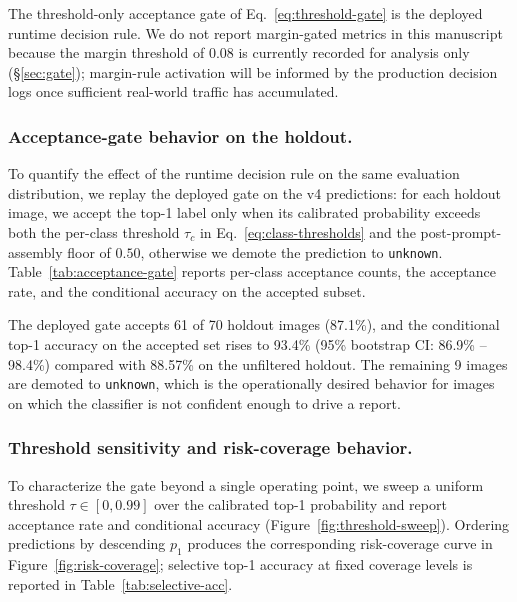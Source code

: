 The threshold-only acceptance gate of Eq.~\ref{eq:threshold-gate} is the
deployed runtime decision rule. We do not report margin-gated metrics
in this manuscript because the margin threshold of $0.08$ is currently
recorded for analysis only (\S\ref{sec:gate}); margin-rule activation
will be informed by the production decision logs once sufficient
real-world traffic has accumulated.

\subsubsection*{Acceptance-gate behavior on the holdout.}

To quantify the effect of the runtime decision rule on the same
evaluation distribution, we replay the deployed gate on the v4
predictions: for each holdout image, we accept the top-1 label only
when its calibrated probability exceeds both the per-class threshold
$\tau_c$ in Eq.~\ref{eq:class-thresholds} and the post-prompt-assembly
floor of $0.50$, otherwise we demote the prediction to
\texttt{unknown}. Table~\ref{tab:acceptance-gate} reports per-class
acceptance counts, the acceptance rate, and the conditional accuracy
on the accepted subset.

\begin{table}[t]
\centering
\caption{Acceptance-gate behavior on the balanced holdout. ``Acceptance
rate'' is the fraction of class examples whose top-1 probability
clears both $\tau_c$ and the $0.50$ floor; ``Acc. $\mid$ accepted'' is
the conditional accuracy on the accepted subset. The aggregate row
reports a nonparametric bootstrap 95\% CI on conditional accuracy.}
\label{tab:acceptance-gate}

\end{table}

The deployed gate accepts 61 of 70 holdout images (87.1\%), and the
conditional top-1 accuracy on the accepted set rises to 93.4\%
(95\% bootstrap CI: 86.9\% -- 98.4\%) compared with 88.57\% on the
unfiltered holdout. The remaining 9 images are demoted to
\texttt{unknown}, which is the operationally desired behavior for
images on which the classifier is not confident enough to drive a
report.

\subsubsection*{Threshold sensitivity and risk-coverage behavior.}

To characterize the gate beyond a single operating point, we sweep a
uniform threshold $\tau \in [0,0.99]$ over the calibrated top-1
probability and report acceptance rate and conditional accuracy
(Figure~\ref{fig:threshold-sweep}). Ordering predictions by descending
$p_1$ produces the corresponding risk-coverage curve in
Figure~\ref{fig:risk-coverage}; selective top-1 accuracy at fixed
coverage levels is reported in Table~\ref{tab:selective-acc}.

